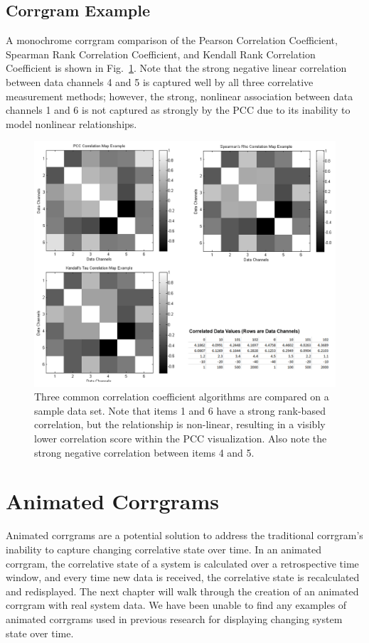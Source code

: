 \subsection{Corrgram Example}

A monochrome corrgram comparison of the Pearson Correlation Coefficient, Spearman Rank Correlation Coefficient, and Kendall Rank Correlation Coefficient is shown in Fig.~\ref{fig:correlation_comparison}. Note that the strong negative linear correlation between data channels 4 and 5 is captured well by all three correlative measurement methods; however, the strong, nonlinear association between data channels 1 and 6 is not captured as strongly by the PCC due to its inability to model nonlinear relationships.

\begin{figure}[h]
\centering
    \includegraphics[width=\columnwidth]{images/correlation_comparison.png}
    \caption{Three common correlation coefficient algorithms are compared on a sample data set. Note that items 1 and 6 have a strong rank-based correlation, but the relationship is non-linear, resulting in a visibly lower correlation score within the PCC visualization. Also note the strong negative correlation between items 4 and 5.}
    \label{fig:correlation_comparison}
\end{figure}

\section{Animated Corrgrams}

Animated corrgrams are a potential solution to address the traditional corrgram's inability to capture changing correlative state over time. In an animated corrgram, the correlative state of a system is calculated over a retrospective time window, and every time new data is received, the correlative state is recalculated and redisplayed. The next chapter will walk through the creation of an animated corrgram with real system data. We have been unable to find any examples of animated corrgrams used in previous research for displaying changing system state over time.